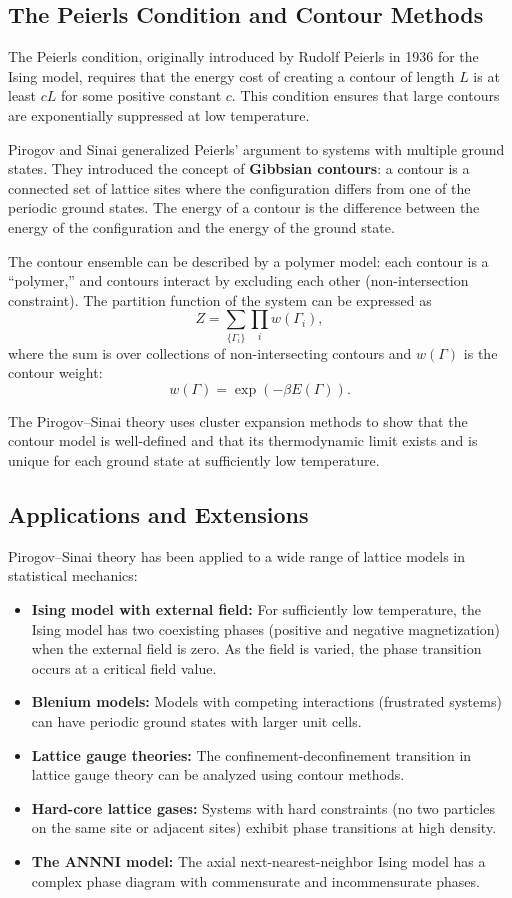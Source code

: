 \subsection{The Peierls Condition and Contour Methods}

The Peierls condition, originally introduced by Rudolf Peierls in 1936 for the Ising model, requires that the energy cost of creating a contour of length \(L\) is at least \(c L\) for some positive constant \(c\). This condition ensures that large contours are exponentially suppressed at low temperature.

Pirogov and Sinai generalized Peierls' argument to systems with multiple ground states. They introduced the concept of \textbf{Gibbsian contours}: a contour is a connected set of lattice sites where the configuration differs from one of the periodic ground states. The energy of a contour is the difference between the energy of the configuration and the energy of the ground state.

The contour ensemble can be described by a polymer model: each contour is a ``polymer,'' and contours interact by excluding each other (non-intersection constraint). The partition function of the system can be expressed as
\[
Z = \sum_{\{\Gamma_i\}} \prod_i w(\Gamma_i),
\]
where the sum is over collections of non-intersecting contours and \(w(\Gamma)\) is the contour weight:
\[
w(\Gamma) = \exp(-\beta E(\Gamma)).
\]

The Pirogov--Sinai theory uses cluster expansion methods to show that the contour model is well-defined and that its thermodynamic limit exists and is unique for each ground state at sufficiently low temperature.

\subsection{Applications and Extensions}

Pirogov--Sinai theory has been applied to a wide range of lattice models in statistical mechanics:

\begin{itemize}
  \item \textbf{Ising model with external field:} For sufficiently low temperature, the Ising model has two coexisting phases (positive and negative magnetization) when the external field is zero. As the field is varied, the phase transition occurs at a critical field value.
  \item \textbf{Blenium models:} Models with competing interactions (frustrated systems) can have periodic ground states with larger unit cells.
  \item \textbf{Lattice gauge theories:} The confinement-deconfinement transition in lattice gauge theory can be analyzed using contour methods.
  \item \textbf{Hard-core lattice gases:} Systems with hard constraints (no two particles on the same site or adjacent sites) exhibit phase transitions at high density.
  \item \textbf{The ANNNI model:} The axial next-nearest-neighbor Ising model has a complex phase diagram with commensurate and incommensurate phases.
\end{itemize}

